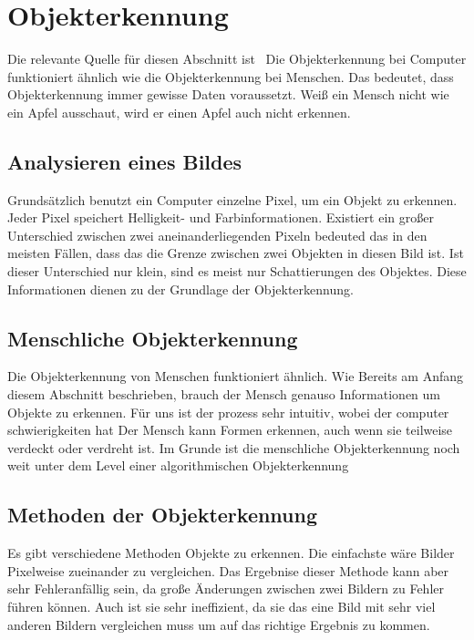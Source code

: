 \section{Objekterkennung}
\label{sec:objekterkennung}

Die relevante Quelle für diesen Abschnitt ist~\cite{Lordemann}
Die Objekterkennung bei Computer funktioniert ähnlich wie die Objekterkennung bei Menschen.
Das bedeutet, dass Objekterkennung immer gewisse Daten voraussetzt.
Weiß ein Mensch nicht wie ein Apfel ausschaut, wird er einen Apfel auch nicht erkennen.

\subsection{Analysieren eines Bildes}\label{subsec:analysing-image}

Grundsätzlich benutzt ein Computer einzelne Pixel, um ein Objekt zu erkennen.
Jeder Pixel speichert Helligkeit- und Farbinformationen.
Existiert ein großer Unterschied zwischen zwei aneinanderliegenden Pixeln bedeuted das in den meisten Fällen, dass das die Grenze zwischen zwei Objekten in diesen Bild ist.
Ist dieser Unterschied nur klein, sind es meist nur Schattierungen des Objektes.
Diese Informationen dienen zu der Grundlage der Objekterkennung.

\subsection{Menschliche Objekterkennung}\label{subsec:menschliche-objekterkennung}

Die Objekterkennung von Menschen funktioniert ähnlich.
Wie Bereits am Anfang diesem Abschnitt beschrieben, brauch der Mensch genauso Informationen um Objekte zu erkennen.
Für uns ist der prozess sehr intuitiv, wobei der computer schwierigkeiten hat
Der Mensch kann Formen erkennen, auch wenn sie teilweise verdeckt oder verdreht ist.
Im Grunde ist die menschliche Objekterkennung noch weit unter dem Level einer algorithmischen Objekterkennung

\subsection{Methoden der Objekterkennung}\label{subsec:methoden-der-objekterkennung}

Es gibt verschiedene Methoden Objekte zu erkennen.
Die einfachste wäre Bilder Pixelweise zueinander zu vergleichen.
Das Ergebnise dieser Methode kann aber sehr Fehleranfällig sein, da große Änderungen zwischen zwei Bildern zu Fehler führen können.
Auch ist sie sehr ineffizient, da sie das eine Bild mit sehr viel anderen Bildern vergleichen muss um auf das richtige Ergebnis zu kommen.


